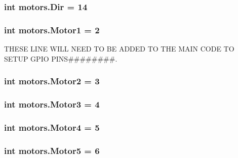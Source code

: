 \subsubsection[{\texorpdfstring{Dir}{Dir}}]{\setlength{\rightskip}{0pt plus 5cm}int motors.\+Dir = 14}\hypertarget{namespacemotors_a673b1a4da4b1bffaca2fc8870bda1d81}{}\label{namespacemotors_a673b1a4da4b1bffaca2fc8870bda1d81}
\subsubsection[{\texorpdfstring{Motor1}{Motor1}}]{\setlength{\rightskip}{0pt plus 5cm}int motors.\+Motor1 = 2}\hypertarget{namespacemotors_a2a0f2bdf759a7ed361344e5c637da1a4}{}\label{namespacemotors_a2a0f2bdf759a7ed361344e5c637da1a4}


T\+H\+E\+SE L\+I\+NE W\+I\+LL N\+E\+ED TO BE A\+D\+D\+ED TO T\+HE M\+A\+IN C\+O\+DE TO S\+E\+T\+UP G\+P\+IO P\+I\+NS\#\#\#\#\#\#\#\#. 

\subsubsection[{\texorpdfstring{Motor2}{Motor2}}]{\setlength{\rightskip}{0pt plus 5cm}int motors.\+Motor2 = 3}\hypertarget{namespacemotors_a6e24b790ad4673224f7e9b6a7e8b2a50}{}\label{namespacemotors_a6e24b790ad4673224f7e9b6a7e8b2a50}
\subsubsection[{\texorpdfstring{Motor3}{Motor3}}]{\setlength{\rightskip}{0pt plus 5cm}int motors.\+Motor3 = 4}\hypertarget{namespacemotors_aa499e40f0b00e705e97b7b064b5c806d}{}\label{namespacemotors_aa499e40f0b00e705e97b7b064b5c806d}
\subsubsection[{\texorpdfstring{Motor4}{Motor4}}]{\setlength{\rightskip}{0pt plus 5cm}int motors.\+Motor4 = 5}\hypertarget{namespacemotors_aa2ad6faa810440e071b919c54ddeac2b}{}\label{namespacemotors_aa2ad6faa810440e071b919c54ddeac2b}
\subsubsection[{\texorpdfstring{Motor5}{Motor5}}]{\setlength{\rightskip}{0pt plus 5cm}int motors.\+Motor5 = 6}\hypertarget{namespacemotors_a7b01a84984168dcfeeb9f33d020f7d38}{}\label{namespacemotors_a7b01a84984168dcfeeb9f33d020f7d38}
